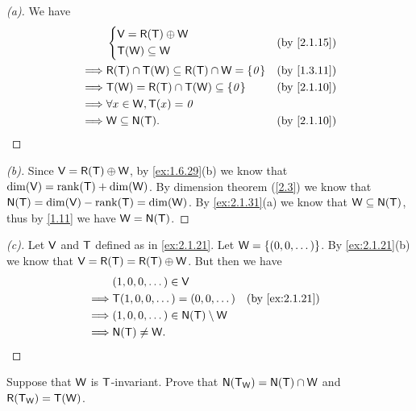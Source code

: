 \begin{proof}[(a)]
  We have
  \begin{align*}
             & \begin{dcases}
      \V = \rg{\T} \oplus \W \\
      \T(\W) \subseteq \W
    \end{dcases}                               &  & \text{(by \cref{2.1.15})} \\
    \implies & \rg{\T} \cap \T(\W) \subseteq \rg{\T} \cap \W = \set{\zv} &  & \text{(by \cref{1.3.11})} \\
    \implies & \T(\W) = \rg{\T} \cap \T(\W) \subseteq \set{\zv}          &  & \text{(by \cref{2.1.10})} \\
    \implies & \forall x \in \W, \T(x) = \zv                                                            \\
    \implies & \W \subseteq \ns{\T}.                                     &  & \text{(by \cref{2.1.10})}
  \end{align*}
\end{proof}

\begin{proof}[(b)]
  Since \(\V = \rg{\T} \oplus \W\), by \cref{ex:1.6.29}(b) we know that \(\dim(\V) = \rk{\T} + \dim(\W)\).
  By dimension theorem (\cref{2.3}) we know that \(\ns{\T} = \dim(\V) - \rk{\T} = \dim(\W)\).
  By \cref{ex:2.1.31}(a) we know that \(\W \subseteq \ns{\T}\), thus by \cref{1.11} we have \(\W = \ns{\T}\).
\end{proof}

\begin{proof}[(c)]
  Let \(\mathsf{V}\) and \(\mathsf{T}\) defined as in \cref{ex:2.1.21}.
  Let \(\mathsf{W} = \left\lbrace(0, 0, \dots)\right\rbrace\).
  By \cref{ex:2.1.21}(b) we know that \(\V = \rg{\T} = \rg{\T} \oplus \W\).
  But then we have
  \begin{align*}
             & (1, 0, 0, \dots) \in \V                                                     \\
    \implies & \T(1, 0, 0, \dots) = (0, 0, \dots)        &  & \text{(by \cref{ex:2.1.21})} \\
    \implies & (1, 0, 0, \dots) \in \ns{\T} \setminus \W                                   \\
    \implies & \ns{\T} \neq \W.
  \end{align*}
\end{proof}

\begin{ex}\label{ex:2.1.32}
  Suppose that \(\mathsf{W}\) is \(\mathsf{T}\)-invariant.
  Prove that \(\ns{\T_{\W}} = \ns{\T} \cap \W\) and \(\rg{\T_{\W}} = \T(\W)\).
\end{ex}

